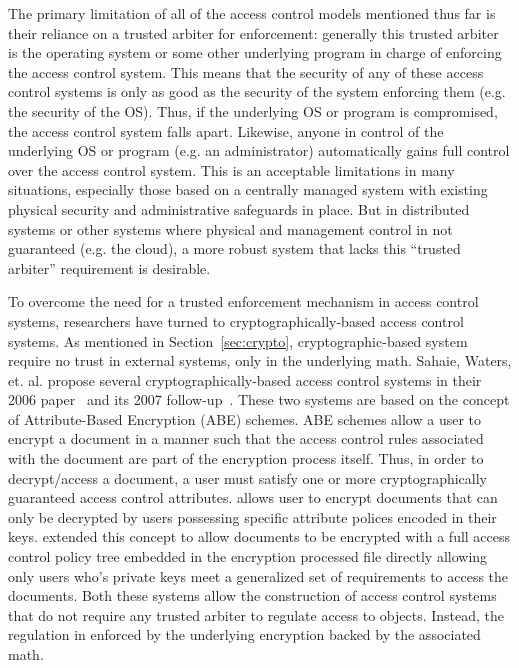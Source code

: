 \documentclass{sig-alternate}
\begin{document}
The primary limitation of all of the access control models mentioned
thus far is their reliance on a trusted arbiter for enforcement:
generally this trusted arbiter is the operating system or some other
underlying program in charge of enforcing the access control
system. This means that the security of any of these access control
systems is only as good as the security of the system enforcing them
(e.g. the security of the OS). Thus, if the underlying OS or program
is compromised, the access control system falls apart. Likewise,
anyone in control of the underlying OS or program (e.g. an
administrator) automatically gains full control over the access
control system. This is an acceptable limitations in many situations,
especially those based on a centrally managed system with existing
physical security and administrative safeguards in place. But in
distributed systems or other systems where physical and management
control in not guaranteed (e.g. the cloud), a more robust system that
lacks this ``trusted arbiter'' requirement is desirable.

To overcome the need for a trusted enforcement mechanism in access
control systems, researchers have turned to cryptographically-based
access control systems. As mentioned in Section~\ref{sec:crypto},
cryptographic-based system require no trust in external systems, only
in the underlying math. Sahaie, Waters, et. al. propose several
cryptographically-based access control systems in their 2006
paper~\cite{Goyal2006} and its 2007 follow-up~\cite{Bethencourt2007}.
These two systems are based on the concept of Attribute-Based
Encryption (ABE) schemes. ABE schemes allow a user to encrypt a
document in a manner such that the access control rules associated
with the document are part of the encryption process itself. Thus, in
order to decrypt/access a document, a user must satisfy one or more
cryptographically guaranteed access control attributes.
\cite{Goyal2006} allows user to encrypt documents that can only be
decrypted by users possessing specific attribute polices encoded in
their keys. \cite{Bethencourt2007} extended this concept to allow
documents to be encrypted with a full access control policy tree
embedded in the encryption processed file directly allowing only users
who's private keys meet a generalized set of requirements to access
the documents. Both these systems allow the construction of access
control systems that do not require any trusted arbiter to regulate
access to objects. Instead, the regulation in enforced by the
underlying encryption backed by the associated math.
\end{document}
